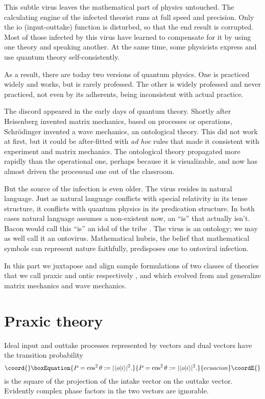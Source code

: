\documentclass[a4paper,11pt]{article}
\begin{document}
This subtle virus 
leaves the mathematical part of  physics
untouched. 
The calculating engine of the infected theorist 
runs at full speed and precision.
Only the io (input-outtake) function is 
disturbed,
so that the end result is corrupted.
Most of those infected by this virus
have learned to compensate for it
by 
using one theory and 
speaking another.
At the same time,
some physicists 
express and use quantum theory 
self-consistently.

As a result, there are today two 
versions of quantum physics.
One is practiced widely and works,  but  is rarely professed.
The other is widely professed and never practiced,
not even by its adherents,
being inconsistent with actual practice.

The discord appeared in the early days of quantum theory.
Shortly after Heisenberg invented matrix mechanics,
based on 
processes or operations,
Schr\"odinger invented a wave mechanics,
an ontological theory.
This did not work at first, 
but it could be after-fitted
with {\em ad hoc}  rules 
that made it consistent with 
experiment and matrix mechanics.
The ontological theory
propagated more rapidly than the operational one,
perhaps because it is visualizable,
and now  has almost driven the processual 
one out of the classroom.

But the source of the infection is even older.
The virus resides in natural language.
Just as natural language conflicts with special relativity in its tense structure,
it conflicts with quantum physics in its
predication structure.
In both cases natural language assumes a non-existent now,
an ``is''  that actually isn't.
Bacon would call this ``is''  an idol of the tribe \cite{BACON}.
The virus is an ontology;  we may as well call it
an ontovirus.
Mathematical hubris,
the belief that mathematical symbols can
represent nature faithfully,  predisposes  one  to ontoviral infection.

In this part we juxtapose and align sample formulations of two classes 
of theories
that we call praxic and ontic respectively
\cite{FINKELSTEIN1996},
and which evolved from and generalize
matrix mechanics and wave mechanics.

\section{Praxic theory}

{\Large  Ideal  input and outtake
 processes
represented by vectors \coordHE{}
and dual vectors \coordHE{} 
have the transition probability 
\begin{equation}\coord{}\boxEquation{ 
\label{eq:MALUS}
P= \cos^2 \theta := |\langle o |i\rangle|^2\/.
}{ 
P= \cos^2 \theta := |\langle o |i\rangle|^2\/.
}{ecuacion}\coordE{}\end{equation}
}
\coordHE{} is the square of the projection of the intake vector on the outtake vector.
Evidently complex phase factors in the two vectors
are ignorable.
\end{document}
